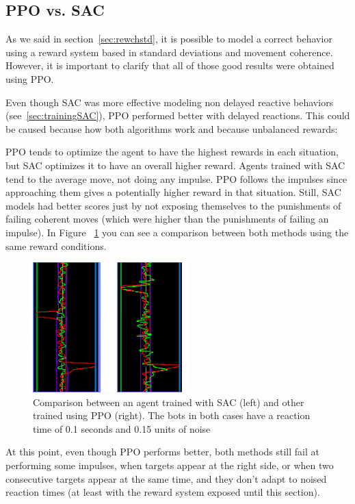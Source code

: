 \subsection{PPO vs. SAC}

As we said in section~\ref{sec:rewchstd}, it is possible to model a correct behavior using a reward system based in standard deviations and movement coherence. However, it is important to clarify that all of those good results were obtained using PPO.

Even though SAC was more effective modeling non delayed reactive behaviors (see~\ref{sec:trainingSAC}), PPO performed better with delayed reactions. This could be caused because how both algorithms work and because unbalanced rewards:

PPO tends to optimize the agent to have the highest rewards in each situation, but SAC optimizes it to have an overall higher reward. Agents trained with SAC tend to the average move, not doing any impulse. PPO follows the impulses since approaching them gives a potentially higher reward in that situation. Still, SAC models had better scores just by not exposing themselves to the punishments of failing coherent moves (which were higher than the punishments of failing an impulse). In Figure ~\ref{fig:rtsacppo} you can see a comparison between both methods using the same reward conditions.

\begin{figure}[h]
  \centering
		\includegraphics[width=.6\textwidth]{img/rtSACvsPPO.png}
  \caption{Comparison between an agent trained with SAC (left) and other trained using PPO (right). The bots in both cases have a reaction time of 0.1 seconds and 0.15 units of noise}
  \label{fig:rtsacppo}
\end{figure}

At this point, even though PPO performs better, both methods still fail at performing some impulses, when targets appear at the right side, or when two consecutive targets appear at the same time, and they don't adapt to noised reaction times (at least with the reward system exposed until this section).

